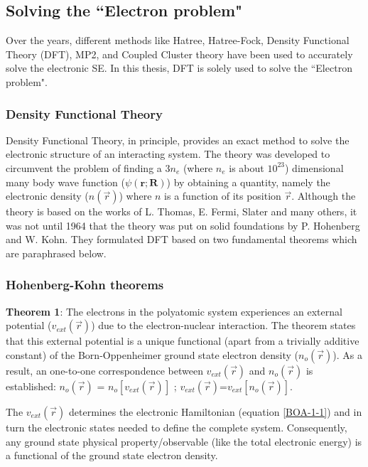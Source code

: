 \subsection{Solving the ``Electron problem"}
\label{electron_problem}
\noindent Over the years, different methods like Hatree, Hatree-Fock, Density Functional Theory (DFT),  MP2, and Coupled Cluster theory have been used to accurately solve the electronic SE. In this thesis, DFT is solely used to solve the ``Electron problem".


 \subsubsection{Density Functional Theory}
 \noindent Density Functional Theory, in principle, provides an exact method to solve the electronic structure of an interacting system. The theory was developed to circumvent the problem of finding a 3$n_e$ (where $n_e$ is about $10^{23}$) dimensional many body wave function ($\psi(\textbf{r};\textbf{R})$) by obtaining a quantity, namely the electronic density ($n(\vec{r})$) where $n$ is a function of its position $\vec{r}$. Although the theory is based on the works of L. Thomas, E. Fermi, Slater and many others, it was not until 1964 that the theory was put on solid foundations by P. Hohenberg and W. Kohn\cite{DFT_HK1964}. They formulated DFT based on two fundamental theorems which are paraphrased below.
 
\subsubsection*{Hohenberg-Kohn theorems}
\noindent \textbf{Theorem 1}: The electrons in the polyatomic system experiences an external potential ($v_{ext}(\vec{r})$) due to the electron-nuclear interaction. The theorem states that this external potential is a unique functional (apart from a trivially additive constant) of the Born-Oppenheimer ground state electron density ($n_o(\vec{r})$). As a result, an one-to-one correspondence between $v_{ext}(\vec{r})$ and  $n_o(\vec{r})$ is established: $n_o(\vec{r})$ = $n_o[v_{ext}(\vec{r})]$ ; $v_{ext}(\vec{r})$=$v_{ext}[n_o(\vec{r})]$. 


\noindent The $v_{ext}(\vec{r})$ determines the electronic Hamiltonian (equation \ref{BOA-1-1}) and in turn the electronic states needed to define the complete system. Consequently, any ground state physical property/observable (like the total electronic energy) is a functional of the ground state electron density.


